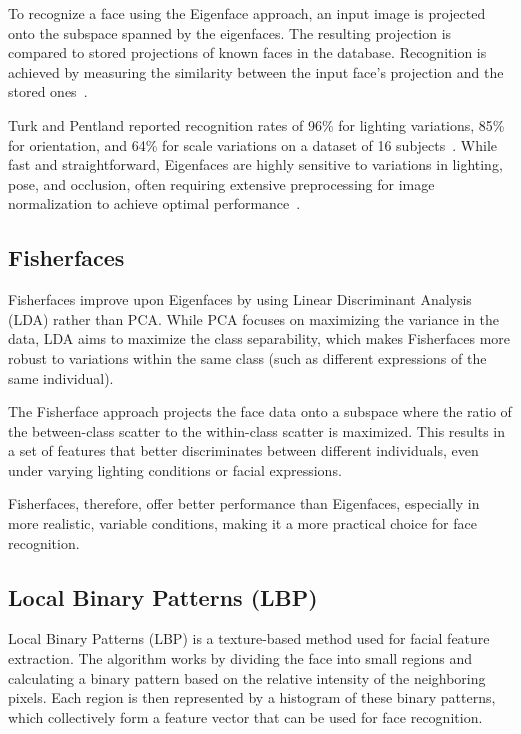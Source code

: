To recognize a face using the Eigenface approach, an input image is projected onto the subspace spanned by the eigenfaces. The resulting projection is compared to stored projections of known faces in the database. Recognition is achieved by measuring the similarity between the input face's projection and the stored ones~\cite{alochana_study_2024}.

Turk and Pentland reported recognition rates of 96\% for lighting variations, 85\% for orientation, and 64\% for scale variations on a dataset of 16 subjects~\cite{turk1991eigenfaces}. While fast and straightforward, Eigenfaces are highly sensitive to variations in lighting, pose, and occlusion, often requiring extensive preprocessing for image normalization to achieve optimal performance~\cite{alochana_study_2024, geeksforgeeks_ml_2021}.

\subsection{Fisherfaces}
Fisherfaces improve upon Eigenfaces by using Linear Discriminant Analysis (LDA) rather than PCA. While PCA focuses on maximizing the variance in the data, LDA aims to maximize the class separability, which makes Fisherfaces more robust to variations within the same class (such as different expressions of the same individual).

The Fisherface approach projects the face data onto a subspace where the ratio of the between-class scatter to the within-class scatter is maximized. This results in a set of features that better discriminates between different individuals, even under varying lighting conditions or facial expressions.

Fisherfaces, therefore, offer better performance than Eigenfaces, especially in more realistic, variable conditions, making it a more practical choice for face recognition.

\subsection{Local Binary Patterns (LBP)}
Local Binary Patterns (LBP) is a texture-based method used for facial feature extraction. The algorithm works by dividing the face into small regions and calculating a binary pattern based on the relative intensity of the neighboring pixels. Each region is then represented by a histogram of these binary patterns, which collectively form a feature vector that can be used for face recognition.


